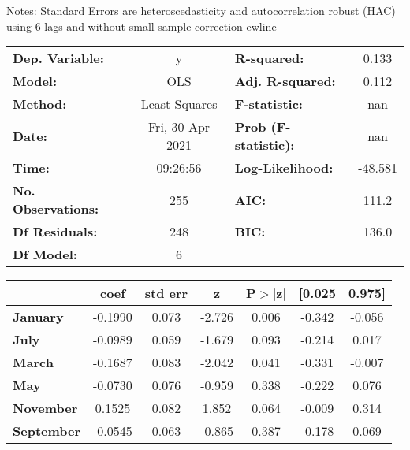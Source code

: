 Notes: \newline
 [1] Standard Errors are heteroscedasticity and autocorrelation robust (HAC) using 6 lags and without small sample correction
ewline\begin{center}
\begin{tabular}{lclc}
\toprule
\textbf{Dep. Variable:}    &        y         & \textbf{  R-squared:         } &     0.133   \\
\textbf{Model:}            &       OLS        & \textbf{  Adj. R-squared:    } &     0.112   \\
\textbf{Method:}           &  Least Squares   & \textbf{  F-statistic:       } &       nan   \\
\textbf{Date:}             & Fri, 30 Apr 2021 & \textbf{  Prob (F-statistic):} &      nan    \\
\textbf{Time:}             &     09:26:56     & \textbf{  Log-Likelihood:    } &   -48.581   \\
\textbf{No. Observations:} &         255      & \textbf{  AIC:               } &     111.2   \\
\textbf{Df Residuals:}     &         248      & \textbf{  BIC:               } &     136.0   \\
\textbf{Df Model:}         &           6      & \textbf{                     } &             \\
\bottomrule
\end{tabular}
\begin{tabular}{lcccccc}
                   & \textbf{coef} & \textbf{std err} & \textbf{z} & \textbf{P$> |$z$|$} & \textbf{[0.025} & \textbf{0.975]}  \\
\midrule
\textbf{January}   &      -0.1990  &        0.073     &    -2.726  &         0.006        &       -0.342    &       -0.056     \\
\textbf{July}      &      -0.0989  &        0.059     &    -1.679  &         0.093        &       -0.214    &        0.017     \\
\textbf{March}     &      -0.1687  &        0.083     &    -2.042  &         0.041        &       -0.331    &       -0.007     \\
\textbf{May}       &      -0.0730  &        0.076     &    -0.959  &         0.338        &       -0.222    &        0.076     \\
\textbf{November}  &       0.1525  &        0.082     &     1.852  &         0.064        &       -0.009    &        0.314     \\
\textbf{September} &      -0.0545  &        0.063     &    -0.865  &         0.387        &       -0.178    &        0.069     \\

\end{tabular}
\end{center}
